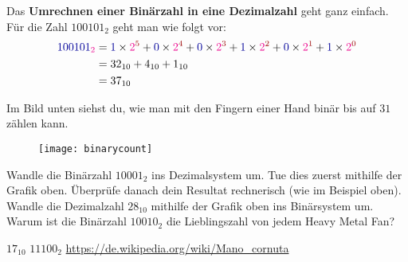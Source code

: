 Das \textbf{Umrechnen einer Binärzahl in eine Dezimalzahl} geht ganz einfach. Für die Zahl $100101_2$ geht man wie folgt vor:
\begin{align}\begin{split}
	\label{equ binaerzahl in basis und nennwerten}
	\textcolor{blue}{100101}_{\textcolor{magenta}{2}}
	&= \textcolor{blue}{1} \times \textcolor{magenta}{2}^{\textcolor{red}{5}}
	 + \textcolor{blue}{0} \times \textcolor{magenta}{2}^{\textcolor{red}{4}}
	 + \textcolor{blue}{0} \times \textcolor{magenta}{2}^{\textcolor{red}{3}}
	 + \textcolor{blue}{1} \times \textcolor{magenta}{2}^{\textcolor{red}{2}}
	 + \textcolor{blue}{0} \times \textcolor{magenta}{2}^{\textcolor{red}{1}}
	 + \textcolor{blue}{1} \times \textcolor{magenta}{2}^{\textcolor{red}{0}}
	\\
	&= 32_{10} + 4_{10} + 1_{10}
	\\
	&= 37_{10}		
\end{split}\end{align}


Im Bild unten siehst du, wie man mit den Fingern einer Hand binär bis auf $31$ zählen kann.
\begin{figure}[H]
	\centering
	\texttt{[image: binarycount]}
\end{figure}

\newpage

\begin{question}
	\begin{tasks}
		\task Wandle die Binärzahl $10001_2$ ins Dezimalsystem um. Tue dies zuerst mithilfe der Grafik oben. Überprüfe danach dein Resultat rechnerisch (wie im Beispiel oben).
		\task Wandle die Dezimalzahl $28_{10}$ mithilfe der Grafik oben ins Binärsystem um.
		\task Warum ist die Binärzahl $10010_2$ die Lieblingszahl von jedem Heavy Metal Fan?
	\end{tasks}
\end{question}
\begin{solution}
	\begin{tasks}
		\task $17_{10}$
		\task $11100_2$
		\task \url{https://de.wikipedia.org/wiki/Mano_cornuta}
	\end{tasks}
\end{solution}


